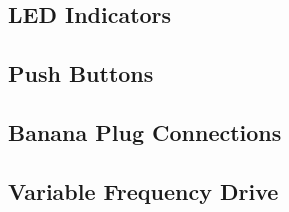 \subsection{LED Indicators}

\newpage

\subsection{Push Buttons}

\newpage

\subsection{Banana Plug Connections}

\newpage

\subsection{Variable Frequency Drive}

\newpage
